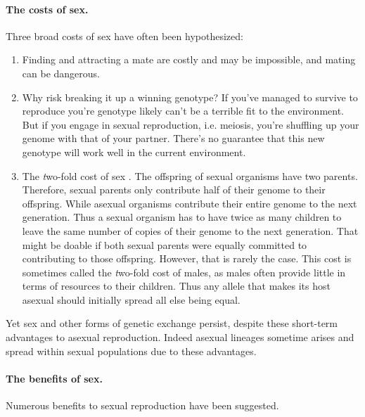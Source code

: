 \paragraph{The costs of sex.}
Three broad costs of sex have often been hypothesized:
\begin{enumerate}
\item  Finding and attracting a mate are costly and may be impossible, and mating can be dangerous.
\item  Why risk breaking it up a winning genotype? If you've managed to survive to reproduce you're genotype likely can't be a terrible fit to the environment. But if you engage in sexual reproduction, i.e. meiosis, you're shuffling up your genome with that of your partner. There's no guarantee that this new genotype will work well in the current environment. 
\item The  {\emph two-fold cost of sex} \citep{smith1971origin}. The offspring of sexual organisms have two parents. Therefore, sexual parents only contribute half of their genome to their offspring. While asexual organisms contribute their entire genome to the next generation. Thus a sexual organism has to have twice as many children to leave the same number of copies of their genome to the next generation. That might be doable if both sexual parents were equally committed to contributing to those offspring. However, that is rarely the case. This cost is sometimes called the {\emph two-fold cost of males}, as males often provide little in terms of resources to their children. Thus any allele that makes its host asexual should initially spread all else being equal. 
\end{enumerate}
Yet sex and other forms of genetic exchange persist, despite these short-term advantages to asexual reproduction. Indeed asexual lineages sometime arises and spread within sexual populations due to these advantages. 

\paragraph{The benefits of sex.}
Numerous benefits to sexual reproduction have been suggested. 

